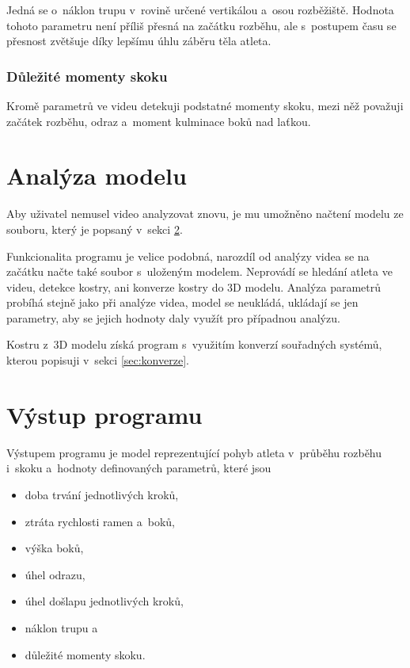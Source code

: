 Jedná se o~náklon trupu v~rovině určené vertikálou a~osou rozběžiště. Hodnota tohoto parametru není příliš přesná na začátku rozběhu, ale s~postupem času se přesnost zvětšuje díky lepšímu úhlu záběru těla atleta.


\subsubsection{Důležité momenty skoku}

Kromě parametrů ve videu detekuji podstatné momenty skoku, mezi něž považuji začátek rozběhu, odraz a~moment kulminace boků nad laťkou.




\section{Analýza modelu}

Aby uživatel nemusel video analyzovat znovu, je mu umožněno načtení modelu ze souboru, který je popsaný v~sekci \ref{sec:vystup}.

Funkcionalita programu je velice podobná, narozdíl od analýzy videa se na začátku načte také soubor s~uloženým modelem. Neprovádí se hledání atleta ve videu, detekce kostry, ani konverze kostry do 3D modelu. Analýza parametrů probíhá stejně jako při analýze videa, model se neukládá, ukládají se jen parametry, aby se jejich hodnoty daly využít pro případnou analýzu.

Kostru z~3D modelu získá program s~využitím konverzí souřadných systémů, kterou popisuji v~sekci \ref{sec:konverze}.




\section{Výstup programu}
\label{sec:vystup}

Výstupem programu je model reprezentující pohyb atleta v~průběhu rozběhu i~skoku a~hodnoty definovaných parametrů, které jsou
\begin{itemize}
    \item doba trvání jednotlivých kroků,
    \item ztráta rychlosti ramen a~boků,
    \item výška boků,
    \item úhel odrazu,
    \item úhel došlapu jednotlivých kroků,
    \item náklon trupu a
    \item důležité momenty skoku.
\end{itemize}


